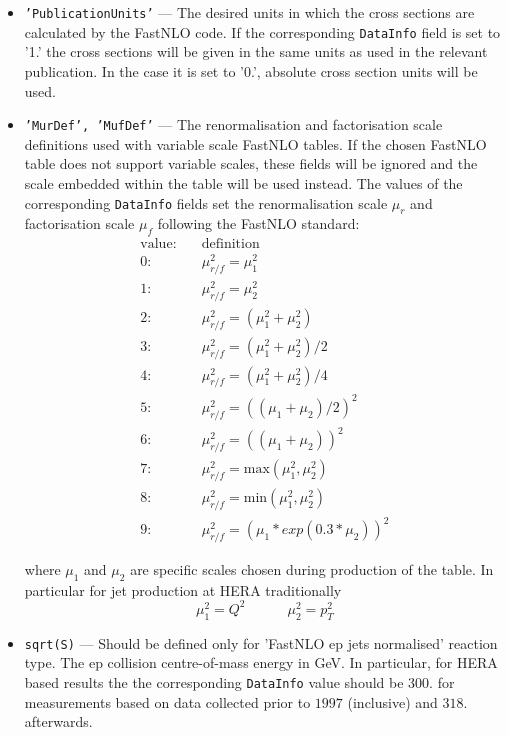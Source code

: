 \begin{itemize}

    \item {\tt 'PublicationUnits'} --- The desired units in which the cross sections 
    are calculated by the FastNLO code. If the corresponding {\tt DataInfo} field is 
    set to '1.' the cross sections will be given in the same units as used in the
    relevant publication. In the case it is set to '0.', absolute cross section
    units will be used. 

    \item {\tt 'MurDef', 'MufDef'} --- The renormalisation and factorisation scale definitions
    used with variable scale FastNLO tables. If the chosen FastNLO table does not support 
    variable scales, these fields will be ignored and the scale embedded within the table will 
    be used instead. The values of the corresponding {\tt DataInfo} fields set 
    the renormalisation scale $\mu_r$ and factorisation scale $\mu_f$ following the FastNLO standard:
    \begin{align*} 
       \text{value} :&\quad \text{definition} \\
       0 :&\quad   \mu_{r/f}^2 = \mu_1^2 \\
       1 :&\quad   \mu_{r/f}^2 = \mu_2^2 \\
       2 :&\quad   \mu_{r/f}^2 = ( \mu_1^2 + \mu_2^2 )\\
       3 :&\quad   \mu_{r/f}^2 = ( \mu_1^2 + \mu_2^2 ) / 2 \\
       4 :&\quad   \mu_{r/f}^2 = ( \mu_1^2 + \mu_2^2 ) / 4 \\
       5 :&\quad   \mu_{r/f}^2 = (( \mu_1 + \mu_2 ) / 2 )^2\\
       6 :&\quad   \mu_{r/f}^2 = (( \mu_1 + \mu_2 ))^2\\
       7 :&\quad   \mu_{r/f}^2 = \text{max}( \mu_1^2, \mu_2^2)\\
       8 :&\quad   \mu_{r/f}^2 = \text{min}( \mu_1^2, \mu_2^2) \\
       9 :&\quad   \mu_{r/f}^2 = (\mu_1 * exp(0.3 * \mu_2)) ^2
   \end{align*}

   where $\mu_1$ and $\mu_2$ are specific scales chosen during production of the table. In particular
   for jet production at HERA traditionally 
   \begin{equation*}
          \mu_1^2 = Q^2 \quad \quad \quad \mu_2^2 = p_T^2
    \end{equation*}  

   \item {\tt sqrt(S)} --- Should be defined only for 'FastNLO ep jets normalised' reaction type. 
         The ep collision centre-of-mass energy in GeV. In particular, for 
         HERA based results the the corresponding {\tt DataInfo} value should be $300.$ for measurements
         based on data collected prior to $1997$ (inclusive) and $318.$ afterwards.


\end{itemize}
